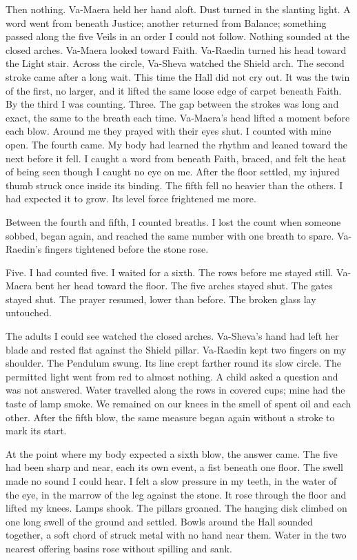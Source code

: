 Then nothing. Va-Maera held her hand aloft. Dust turned in the slanting light. A word went from beneath Justice; another returned from Balance; something passed along the five Veils in an order I could not follow. Nothing sounded at the closed arches. Va-Maera looked toward Faith. Va-Raedin turned his head toward the Light stair. Across the circle, Va-Sheva watched the Shield arch. The second stroke came after a long wait. This time the Hall did not cry out. It was the twin of the first, no larger, and it lifted the same loose edge of carpet beneath Faith. By the third I was counting. Three. The gap between the strokes was long and exact, the same to the breath each time. Va-Maera's head lifted a moment before each blow. Around me they prayed with their eyes shut. I counted with mine open. The fourth came. My body had learned the rhythm and leaned toward the next before it fell. I caught a word from beneath Faith, braced, and felt the heat of being seen though I caught no eye on me. After the floor settled, my injured thumb struck once inside its binding. The fifth fell no heavier than the others. I had expected it to grow. Its level force frightened me more.\par

Between the fourth and fifth, I counted breaths. I lost the count when someone sobbed, began again, and reached the same number with one breath to spare. Va-Raedin's fingers tightened before the stone rose.\par

Five. I had counted five. I waited for a sixth. The rows before me stayed still. Va-Maera bent her head toward the floor. The five arches stayed shut. The gates stayed shut. The prayer resumed, lower than before. The broken glass lay untouched.\par

The adults I could see watched the closed arches. Va-Sheva's hand had left her blade and rested flat against the Shield pillar. Va-Raedin kept two fingers on my shoulder. The Pendulum swung. Its line crept farther round its slow circle. The permitted light went from red to almost nothing. A child asked a question and was not answered. Water travelled along the rows in covered cups; mine had the taste of lamp smoke. We remained on our knees in the smell of spent oil and each other. After the fifth blow, the same measure began again without a stroke to mark its start.\par

At the point where my body expected a sixth blow, the answer came. The five had been sharp and near, each its own event, a fist beneath one floor. The swell made no sound I could hear. I felt a slow pressure in my teeth, in the water of the eye, in the marrow of the leg against the stone. It rose through the floor and lifted my knees. Lamps shook. The pillars groaned. The hanging disk climbed on one long swell of the ground and settled. Bowls around the Hall sounded together, a soft chord of struck metal with no hand near them. Water in the two nearest offering basins rose without spilling and sank.\par

